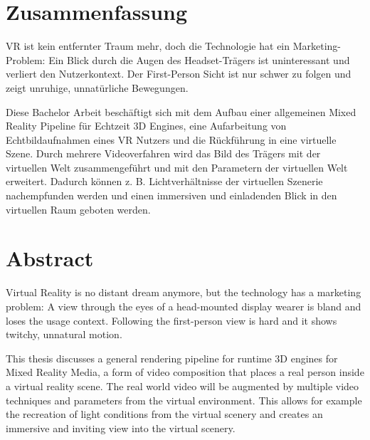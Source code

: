 %
\chapter*{Zusammenfassung}
\label{sec:abstract}
\vspace*{-10mm}

VR ist kein entfernter Traum mehr, doch die Technologie hat ein 
Marketing-Problem: Ein Blick durch die Augen des Headset-Trägers ist 
uninteressant und verliert den Nutzerkontext. Der First-Person Sicht ist nur 
schwer zu folgen und zeigt unruhige, unnatürliche Bewegungen.

Diese Bachelor Arbeit beschäftigt sich mit dem Aufbau einer allgemeinen Mixed 
Reality Pipeline für Echtzeit 3D Engines, eine Aufarbeitung von 
Echtbildaufnahmen eines VR Nutzers und die Rückführung in eine virtuelle Szene. 
Durch mehrere Videoverfahren wird das Bild des Trägers mit der virtuellen Welt 
zusammengeführt und mit den Parametern der virtuellen Welt erweitert.
\newline
Dadurch können z. B. Lichtverhältnisse der virtuellen Szenerie nachempfunden 
werden und einen immersiven und einladenden Blick in den virtuellen Raum 
geboten werden.

\begin{center}
	\hrulefill
\end{center}

\vspace*{-20mm}
{\let\clearpage\relax\chapter*{Abstract}}
\vspace*{-10mm}

Virtual Reality is no distant dream anymore, but the technology has a 
marketing problem: A view through the eyes of a head-mounted display wearer 
is bland and loses the usage context. Following the first-person view is hard 
and it shows twitchy, unnatural motion.

This thesis discusses a general rendering pipeline for runtime 3D engines for 
Mixed Reality Media, a form of video composition that places a real person 
inside a virtual reality scene. The real world video will be augmented by 
multiple video techniques and parameters from the virtual environment.
\newline
This allows for example the recreation of light conditions from the virtual 
scenery and creates an immersive and inviting view into the virtual scenery.